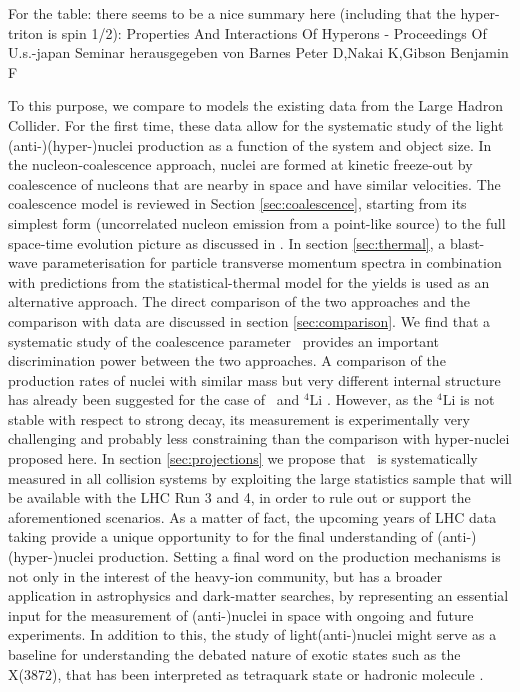 \documentclass[a4paper,11pt]{scrartcl} %
\begin{document}
For the table: there seems to be a nice summary here (including that the hyper-triton is spin 1/2):
Properties And Interactions Of Hyperons - Proceedings Of U.s.-japan Seminar
herausgegeben von Barnes Peter D,Nakai K,Gibson Benjamin F

To this purpose, we compare to models the existing data from the Large Hadron Collider. For the first time, these data allow for the systematic study of the light (anti-)(hyper-)nuclei production as a function of the system and object size. 
In the nucleon-coalescence approach, nuclei are formed at kinetic freeze-out by coalescence of nucleons that are nearby in space and have similar velocities. The coalescence model is reviewed in Section \ref{sec:coalescence}, starting from its simplest form (uncorrelated nucleon emission from a point-like source) to the full space-time evolution picture as discussed in \cite{Scheibl:1998tk}. In section \ref{sec:thermal}, a blast-wave parameterisation for particle transverse momentum spectra in combination with predictions from the statistical-thermal model for the yields is used as an alternative approach. 
The direct comparison of the two approaches and the comparison with data are discussed in section \ref{sec:comparison}.
We find that a systematic study of the coalescence parameter \bA~provides an important discrimination power between the two approaches. 
A comparison of the production rates of nuclei with similar mass but very different internal structure has already been suggested for the case of \hefour~and ${}^{4}\mathrm{Li}$ \cite{Bazak:2018hgl}. However, as the ${}^{4}\mathrm{Li}$ is not stable with respect to strong decay, its measurement is experimentally very challenging and probably less constraining than the comparison with hyper-nuclei proposed here.
In section \ref{sec:projections} we propose that \bA~is systematically measured in all collision systems by exploiting the large statistics sample that will be available with the LHC Run 3 and 4, in order to rule out or support the aforementioned scenarios. As a matter of fact, the upcoming years of LHC data taking provide a unique opportunity to for the final understanding of (anti-)(hyper-)nuclei production.
Setting a final word on the production mechanisms is not only in the interest of the heavy-ion community, but has a broader application in astrophysics and dark-matter searches, by representing an essential input for the measurement of (anti-)nuclei in space with ongoing \cite{Alcaraz:2000ss} and future \cite{AMS100, Aramaki:2015laa} experiments. 
In addition to this, the study of light(anti-)nuclei might serve as a baseline for understanding the debated nature of exotic states such as the X(3872), that has been interpreted as tetraquark state or hadronic molecule \cite{Esposito:2015fsa, Cho:2017dcy}.
\end{document}
